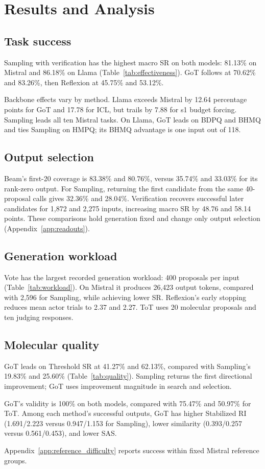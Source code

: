 \section{Results and Analysis}
\label{sec:results}
\subsection{Task success}
Sampling with verification has the highest macro SR on both models: 81.13\% on Mistral and 86.18\% on Llama (Table~\ref{tab:effectiveness}). GoT follows at 70.62\% and 83.26\%, then Reflexion at 45.75\% and 53.12\%.

Backbone effects vary by method. Llama exceeds Mistral by 12.64 percentage points for GoT and 17.78 for ICL, but trails by 7.88 for s1 budget forcing. Sampling leads all ten Mistral tasks. On Llama, GoT leads on BDPQ and BHMQ and ties Sampling on HMPQ; its BHMQ advantage is one input out of 118.

\subsection{Output selection}
Beam's first-20 coverage is 83.38\% and 80.76\%, versus 35.74\% and 33.03\% for its rank-zero output. For Sampling, returning the first candidate from the same 40-proposal calls gives 32.36\% and 28.04\%. Verification recovers successful later candidates for 1,872 and 2,275 inputs, increasing macro SR by 48.76 and 58.14 points. These comparisons hold generation fixed and change only output selection (Appendix~\ref{app:readouts}).

\subsection{Generation workload}
Vote has the largest recorded generation workload: 400 proposals per input (Table~\ref{tab:workload}). On Mistral it produces 26,423 output tokens, compared with 2,596 for Sampling, while achieving lower SR. Reflexion's early stopping reduces mean actor trials to 2.37 and 2.27. ToT uses 20 molecular proposals and ten judging responses.

\subsection{Molecular quality}
GoT leads on Threshold SR at 41.27\% and 62.13\%, compared with Sampling's 19.83\% and 25.60\% (Table~\ref{tab:quality}). Sampling returns the first directional improvement; GoT uses improvement magnitude in search and selection.

GoT's validity is 100\% on both models, compared with 75.47\% and 50.97\% for ToT. Among each method's successful outputs, GoT has higher Stabilized RI (1.691/2.223 versus 0.947/1.153 for Sampling), lower similarity (0.393/0.257 versus 0.561/0.453), and lower SAS.

Appendix~\ref{app:reference_difficulty} reports success within fixed Mistral reference groups.
